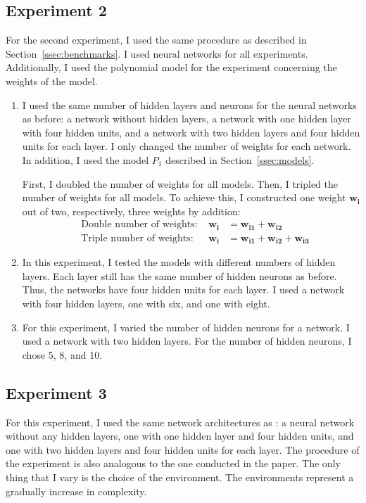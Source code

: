 \subsection{Experiment 2}
For the second experiment, I used the same procedure as described in Section~\ref{ssec:benchmarks}. I used neural networks for all experiments. Additionally, I used the polynomial model for the experiment concerning the weights of the model.
\begin{enumerate}
  \item I used the same number of hidden layers and neurons for the neural networks as before: a network without hidden layers, a network with one hidden layer with four hidden units, and a network with two hidden layers and four hidden units for each layer. I only changed the number of weights for each network. In addition, I used the model $P_1$ described in Section~\ref{ssec:models}.

  First, I doubled the number of weights for all models. Then, I tripled the number of weights for all models. To achieve this, I constructed one weight $\mathbf{w_i}$ out of two, respectively, three weights by addition:
  \begin{align*}
    &\text{Double number of weights: } &\mathbf{w_i} &= \mathbf{w_{i1}} + \mathbf{w_{i2}} \\
    &\text{Triple number of weights: } &\mathbf{w_{i}} &= \mathbf{w_{i1}} + \mathbf{w_{i2}} + \mathbf{w_{i3}}
  \end{align*}
  \item In this experiment, I tested the models with different numbers of hidden layers. Each layer still has the same number of hidden neurons as before. Thus, the networks have four hidden units for each layer. I used a network with four hidden layers, one with six, and one with eight.
  \item For this experiment, I varied the number of hidden neurons for a network. I used a network with two hidden layers. For the number of hidden neurons, I chose 5, 8, and 10.
\end{enumerate}

\subsection{Experiment 3}
For this experiment, I used the same network architectures as \citet{oller_analyzing_2020}: a neural network without any hidden layers, one with one hidden layer and four hidden units, and one with two hidden layers and four hidden units for each layer. The procedure of the experiment is also analogous to the one conducted in the paper. The only thing that I vary is the choice of the environment. The environments represent a gradually increase in complexity. \\

